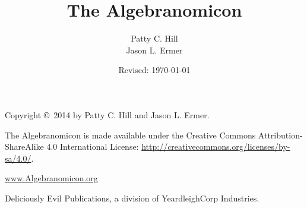 % 
%

\title{The Algebranomicon}
\author{Patty C. Hill \\ Jason L. Ermer}
\date{Revised: \today}

\makeatletter
\let\TITLE\@title
\let\AUTHOR\@author
\let\DATE\@date
\makeatother


\pagestyle{empty}

%  
%

\color{covertextcolor}			%

{\fontsize{32pt}{0pt}\selectfont \textbf{\TITLE}\par}

\makebox[0pt][l]{\rule{1.5\textwidth}{1pt}}

\vfill
{\LARGE \textbf{\AUTHOR}\par}

\clearpage

\restoregeometry		%
\color{black}			%
\ClearWallPaper			%

%  
%
\maketitle

\clearpage

%  
%
\null
\vfill
\noindent
Copyright \copyright\ 2014 by Patty C. Hill and Jason L. Ermer.

The Algebranomicon is made available under the Creative Commons Attribution-ShareAlike 4.0 International License: \url{http://creativecommons.org/licenses/by-sa/4.0/}.

\href{http://www.algebranomicon.org}{www.Algebranomicon.org}

Deliciously Evil Publications, a division of YeardleighCorp Industries.

\clearpage
